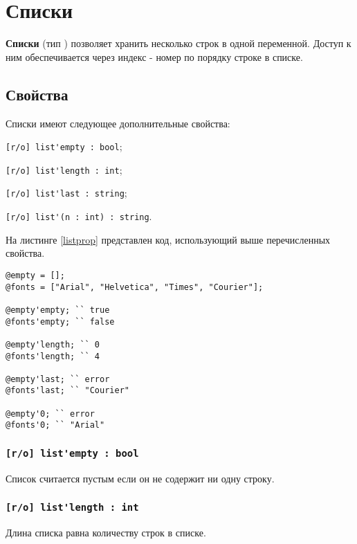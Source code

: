 \section{Списки}

{\bf Списки} (тип ) позволяет хранить несколько строк в одной переменной. Доступ к ним обеспечивается через индекс - номер по порядку строке в списке.

\subsection{Свойства}

Списки имеют следующее дополнительные свойства:
\begin{icItems}
\item
	\lstinline|[r/o] list'empty : bool|;
\item
	\lstinline|[r/o] list'length : int|;
\item
	\lstinline|[r/o] list'last : string|;
\item
	\lstinline|[r/o] list'(n : int) : string|.
\end{icItems}

На листинге \ref{listprop} представлен код, использующий выше перечисленных свойства.

\begin{lstlisting}[caption=Свойства класса list, label=listprop]
@empty = [];
@fonts = ["Arial", "Helvetica", "Times", "Courier"];

@empty'empty; `` true
@fonts'empty; `` false

@empty'length; `` 0
@fonts'length; `` 4

@empty'last; `` error
@fonts'last; `` "Courier"

@empty'0; `` error
@fonts'0; `` "Arial"
\end{lstlisting}

\subsubsection{\lstinline|[r/o] list'empty : bool|}

Список считается пустым если он не содержит ни одну строку.

\subsubsection{\lstinline|[r/o] list'length : int|}

Длина списка равна количеству строк в списке.

